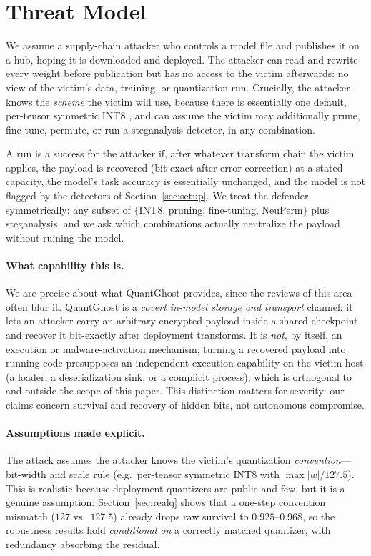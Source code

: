 \documentclass[10pt,journal]{IEEEtran}
\theoremstyle{remark}
\newcommand{\sys}{\mbox{QuantGhost}}
\begin{document}
\section{Threat Model}\label{sec:threat}
We assume a supply-chain attacker who controls a model file and publishes it on a hub,
hoping it is downloaded and deployed. The attacker can read and rewrite every weight
before publication but has no access to the victim afterwards: no view of the victim's
data, training, or quantization run. Crucially, the attacker knows the \emph{scheme}
the victim will use, because there is essentially one default, per-tensor symmetric
INT8 \cite{jacob2018quantization}, and can assume the victim may additionally
prune, fine-tune, permute, or run a steganalysis detector, in any combination.

A run is a success for the attacker if, after whatever transform chain the victim
applies, the payload is recovered (bit-exact after error correction) at a stated
capacity, the model's task accuracy is essentially unchanged, and the model is not
flagged by the detectors of Section~\ref{sec:setup}. We treat the defender
symmetrically: any subset of $\{$INT8, pruning, fine-tuning, NeuPerm$\}$ plus
steganalysis, and we ask which combinations actually neutralize the payload without
ruining the model.

\paragraph{What capability this is.} We are precise about what \sys{} provides, since the
reviews of this area often blur it. \sys{} is a \emph{covert in-model storage and transport}
channel: it lets an attacker carry an arbitrary encrypted payload inside a shared checkpoint
and recover it bit-exactly after deployment transforms. It is \emph{not}, by itself, an
execution or malware-activation mechanism; turning a recovered payload into running code
presupposes an independent execution capability on the victim host (a loader, a deserialization
sink, or a complicit process), which is orthogonal to and outside the scope of this paper. This
distinction matters for severity: our claims concern survival and recovery of hidden bits, not
autonomous compromise.

\paragraph{Assumptions made explicit.} The attack assumes the attacker knows the victim's
quantization \emph{convention}---bit-width and scale rule (e.g.\ per-tensor symmetric INT8 with
$\max|w|/127.5$). This is realistic because deployment quantizers are public and few, but it is a
genuine assumption: Section~\ref{sec:realq} shows that a one-step convention mismatch
($127$ vs.\ $127.5$) already drops raw survival to $0.925$--$0.968$, so the robustness results
hold \emph{conditional on} a correctly matched quantizer, with redundancy absorbing the residual.
\end{document}
